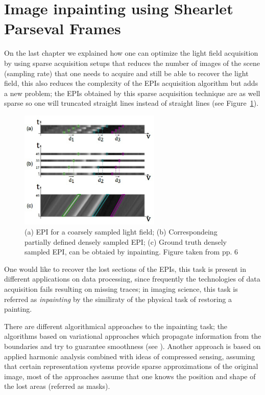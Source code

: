 \section{Image inpainting using Shearlet Parseval Frames}
\label{sec:shearlet_parseval_inpainting}

On the last chapter we explained how one can optimize the light field acquisition by using sparse acquisition setups that reduces the number of images of the scene (sampling rate) that one needs to acquire and still be able to recover the light field, this also reduces the complexity of the EPIs acquisition algorithm but adds a new problem; the EPIs obtained by this sparse acquisition technique are as well sparse so one will truncated straight lines instead of straight lines (see Figure~\ref{fig:sparse_EPI}). 

\begin{figure}[h!]
\centering
\includegraphics[width=0.6\textwidth]{./Diagrams/sparse_EPI.jpg}
\caption{(a) EPI for a coarsely sampled light field; (b) Correspondeing partially defined densely sampled EPI; (c) Ground truth densely sampled EPI, can be obtaied by inpainting. Figure taken from \cite{LF-Shearlets} pp. 6}
\label{fig:sparse_EPI}
\end{figure}

One would like to recover the lost sections of the EPIs, this task is present in different applications on data processing, since frequently the technologies of data acquisition fails resulting on missing traces; in imaging science, this task is referred as \textit{inpainting} by the similiraty of the physical task of restoring a painting. 

\bigskip

There are different algorithmical approaches to the inpainting task; the algorithms based on variational approaches which propagate information from the boundaries and try to guarantee smoothness (see \cite{Ballester}). Another approach is based on applied harmonic analysis combined with ideas of compressed sensing, assuming that certain representation systems provide sparse approximations of the original image, most of the approaches assume that one knows the position and shape of the lost areas (referred as masks).

